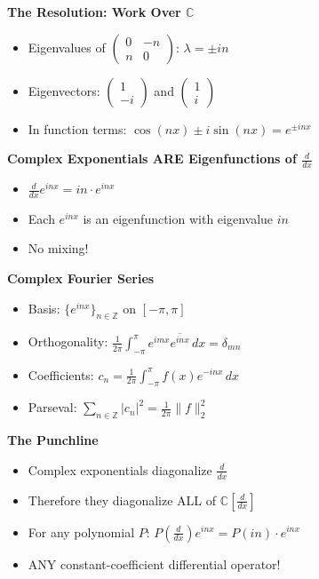 \documentclass[
  10pt,
  letterpaper,
]{scrbook}
\providecommand{\tightlist}{%
  \setlength{\itemsep}{0pt}\setlength{\parskip}{0pt}}
\begin{document}
\textbf{The Resolution: Work Over \(\mathbb{C}\)}

\begin{itemize}
\tightlist
\item
  Eigenvalues of \(\begin{pmatrix} 0 & -n \\ n & 0 \end{pmatrix}\):
  \(\lambda = \pm in\)
\item
  Eigenvectors: \(\begin{pmatrix} 1 \\ -i \end{pmatrix}\) and
  \(\begin{pmatrix} 1 \\ i \end{pmatrix}\)
\item
  In function terms: \(\cos(nx) \pm i\sin(nx) = e^{\pm inx}\)
\end{itemize}

\textbf{Complex Exponentials ARE Eigenfunctions of \(\frac{d}{dx}\)}

\begin{itemize}
\tightlist
\item
  \(\frac{d}{dx}e^{inx} = in \cdot e^{inx}\)
\item
  Each \(e^{inx}\) is an eigenfunction with eigenvalue \(in\)
\item
  No mixing!
\end{itemize}

\textbf{Complex Fourier Series}

\begin{itemize}
\tightlist
\item
  Basis: \(\{e^{inx}\}_{n \in \mathbb{Z}}\) on \([-\pi, \pi]\)
\item
  Orthogonality:
  \(\frac{1}{2\pi}\int_{-\pi}^{\pi} e^{imx}\overline{e^{inx}}\, dx = \delta_{mn}\)
\item
  Coefficients:
  \(c_n = \frac{1}{2\pi}\int_{-\pi}^{\pi} f(x)e^{-inx}\, dx\)
\item
  Parseval:
  \(\sum_{n \in \mathbb{Z}} |c_n|^2 = \frac{1}{2\pi}\|f\|_2^2\)
\end{itemize}

\textbf{The Punchline}

\begin{itemize}
\tightlist
\item
  Complex exponentials diagonalize \(\frac{d}{dx}\)
\item
  Therefore they diagonalize ALL of \(\mathbb{C}[\frac{d}{dx}]\)
\item
  For any polynomial \(P\):
  \(P\left(\frac{d}{dx}\right)e^{inx} = P(in) \cdot e^{inx}\)
\item
  ANY constant-coefficient differential operator!
\end{itemize}
\end{document}

